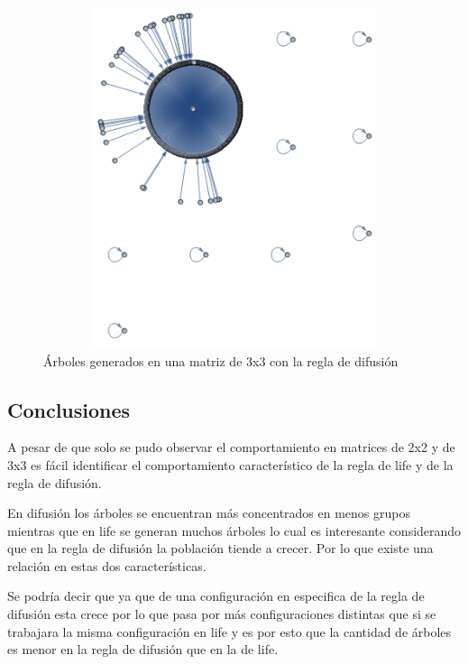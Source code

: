\begin{figure}[H]
\begin{center}
 \includegraphics[width=12cm, height=10cm]{./img/tam-3-diffusion.png}
 \caption{Árboles generados en una matriz de 3x3 con la regla de difusión}
 \label{fig:difusion3}
\end{center}
\end{figure}

\subsection{Conclusiones}
A pesar de que solo se pudo observar el comportamiento en matrices de 2x2 y de 3x3 es fácil identificar el comportamiento característico de la regla de life y de la regla de difusión.

En difusión los árboles se encuentran más concentrados en menos grupos mientras que en life se generan muchos árboles lo cual es interesante considerando que en la regla de difusión la población tiende a crecer. Por lo que existe una relación en estas dos características.

Se podría decir que ya que de una configuración en especifica de la regla de difusión esta crece por lo que pasa por más configuraciones distintas que si se trabajara la misma configuración en life y es por esto que la cantidad de árboles es menor en la regla de difusión que en la de life.
